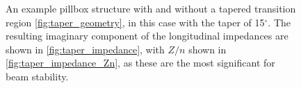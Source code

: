 \begin{figure}
\begin{center}
\end{center}
\caption{An example pillbox structure with and without a tapered transition region \ref{fig:taper_geometry}, in this case with the taper of 15$^{\circ}$. The resulting imaginary component of the longitudinal impedances are shown in \ref{fig:taper_impedance}, with $Z/n$ shown in \ref{fig:taper_impedance_Zn}, as these are the most significant for beam stability.}
\label{fig:taper_ex}
\end{figure}

